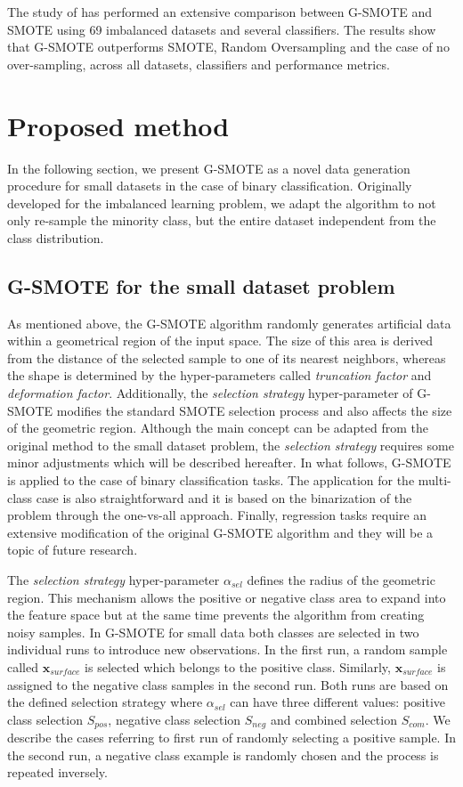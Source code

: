 \documentclass[parskip=full]{scrartcl}
\begin{document}
The study of \cite{Douzas.2019} has performed an extensive comparison between
G-SMOTE and SMOTE using 69 imbalanced datasets and several classifiers. The
results show that G-SMOTE outperforms SMOTE, Random Oversampling and the case of
no over-sampling, across all datasets, classifiers and performance metrics.

\section{Proposed method}

In the following section, we present G-SMOTE as a novel data generation
procedure for small datasets in the case of binary classification. Originally
developed for the imbalanced learning problem, we adapt the algorithm to not
only re-sample the minority class, but the entire dataset independent from the
class distribution. 

\subsection{G-SMOTE for the small dataset problem}

As mentioned above, the G-SMOTE algorithm randomly generates artificial data
within a geometrical region of the input space. The size of this area is derived
from the distance of the selected sample to one of its nearest neighbors,
whereas the shape is determined by the hyper-parameters called
\textit{truncation factor} and \textit{deformation factor}. Additionally, the
\textit{selection strategy} hyper-parameter  of G-SMOTE modifies the standard
SMOTE selection process and also affects the size of the geometric region.
Although the main concept can be adapted from the original method to the small
dataset problem, the \textit{selection strategy} requires some minor adjustments which
will be described hereafter. In what follows, G-SMOTE is applied to the case of
binary classification tasks. The application for the multi-class case is also
straightforward and it is based on the binarization of the problem through the
one-vs-all approach. Finally, regression tasks require an extensive modification
of the original G-SMOTE algorithm and they will be a topic of future research.

The \textit{selection strategy} hyper-parameter \( \alpha_{sel} \) defines the
radius of the geometric region. This mechanism allows the positive or negative
class area to expand into the feature space but at the same time prevents the
algorithm from creating noisy samples. In G-SMOTE for small data both classes
are selected in two individual runs to introduce new observations. In the first
run, a random sample called \( \textbf{x}_{surface} \) is selected which belongs
to the positive class. Similarly, \( \textbf{x}_{surface} \) is assigned to the
negative class samples in the second run. Both runs are based on the defined
selection strategy where \( \alpha_{sel} \) can have three different values:
positive class selection \( S_{pos} \), negative class selection \( S_{neg} \)
and combined selection \( S_{com} \). We describe the cases referring to first
run of randomly selecting a positive sample. In the second run, a negative class
example is randomly chosen and the process is repeated inversely. 
\end{document}

